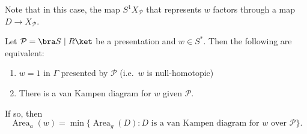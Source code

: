\documentclass[a4paper]{article}
\DeclareMathOperator\Area{Area}
\begin{document}
Note that in this case, the map $S^1 X_{\mathcal{P}}$ that represents $w$ factors through a map $D \to X_\mathcal{P}$.

\begin{lemma}
  Let $\mathcal{P} = \bra S \mid R\ket$ be a presentation and $w \in S^*$. Then the following are equivalent:
  \begin{enumerate}
    \item $w = 1$ in $\Gamma$ presented by $\mathcal{P}$ (i.e.\ $w$ is null-homotopic)
    \item There is a van Kampen diagram for $w$ given $\mathcal{P}$.
  \end{enumerate}
  If so, then
  \[
    \Area_a(w) = \min \{\Area_g(D): D\text{ is a van Kampen diagram for $w$ over $\mathcal{P}$}\}.
  \]
\end{lemma}
\end{document}
